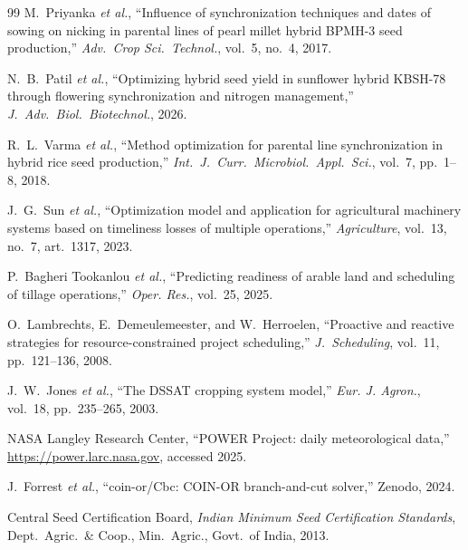 \documentclass[10pt,twocolumn]{article}
\begin{document}
\begin{thebibliography}{99}
M.~Priyanka \textit{et al.},
``Influence of synchronization techniques and dates of sowing on nicking in
parental lines of pearl millet hybrid BPMH-3 seed production,''
\textit{Adv.\ Crop Sci.\ Technol.}, vol.~5, no.~4, 2017.

N.~B.~Patil \textit{et al.},
``Optimizing hybrid seed yield in sunflower hybrid KBSH-78 through flowering
synchronization and nitrogen management,'' \textit{J.\ Adv.\ Biol.\
Biotechnol.}, 2026.

R.~L.~Varma \textit{et al.},
``Method optimization for parental line synchronization in hybrid rice seed
production,'' \textit{Int.\ J.\ Curr.\ Microbiol.\ Appl.\ Sci.}, vol.~7,
pp.~1--8, 2018.

J.~G.~Sun \textit{et al.},
``Optimization model and application for agricultural machinery systems based
on timeliness losses of multiple operations,'' \textit{Agriculture},
vol.~13, no.~7, art.~1317, 2023.

P.~Bagheri Tookanlou \textit{et al.},
``Predicting readiness of arable land and scheduling of tillage operations,'' \textit{Oper. Res.}, vol.~25, 2025.

O.~Lambrechts, E.~Demeulemeester, and W.~Herroelen,
``Proactive and reactive strategies for resource-constrained project
scheduling,'' \textit{J.\ Scheduling}, vol.~11, pp.~121--136, 2008.

J.~W.~Jones \textit{et al.},
``The DSSAT cropping system model,'' \textit{Eur. J. Agron.}, vol.~18, pp.~235--265, 2003.

NASA Langley Research Center, ``POWER Project: daily meteorological data,''
\url{https://power.larc.nasa.gov}, accessed 2025.

J.~Forrest \textit{et al.}, ``coin-or/Cbc: COIN-OR branch-and-cut solver,''
Zenodo, 2024.

Central Seed Certification Board, \textit{Indian Minimum Seed Certification
Standards}, Dept.\ Agric.\ \& Coop., Min.\ Agric., Govt.\ of India, 2013.

\end{thebibliography}
\end{document}
